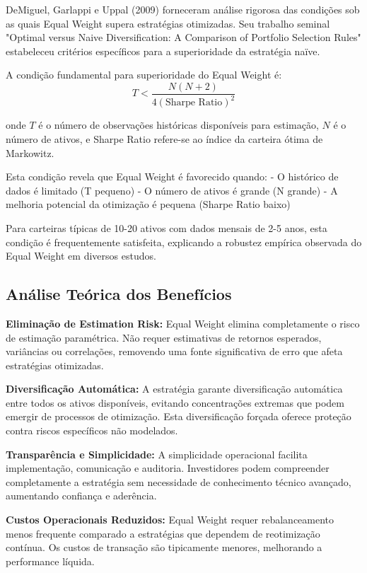 DeMiguel, Garlappi e Uppal (2009) forneceram análise rigorosa das condições sob as quais Equal Weight supera estratégias otimizadas. Seu trabalho seminal "Optimal versus Naive Diversification: A Comparison of Portfolio Selection Rules" estabeleceu critérios específicos para a superioridade da estratégia naïve.

A condição fundamental para superioridade do Equal Weight é:
\begin{equation}
T < \frac{N(N+2)}{4(\text{Sharpe Ratio})^2}
\end{equation}

onde $T$ é o número de observações históricas disponíveis para estimação, $N$ é o número de ativos, e Sharpe Ratio refere-se ao índice da carteira ótima de Markowitz.

Esta condição revela que Equal Weight é favorecido quando:
- O histórico de dados é limitado (T pequeno)
- O número de ativos é grande (N grande)
- A melhoria potencial da otimização é pequena (Sharpe Ratio baixo)

Para carteiras típicas de 10-20 ativos com dados mensais de 2-5 anos, esta condição é frequentemente satisfeita, explicando a robustez empírica observada do Equal Weight em diversos estudos.

\subsection{Análise Teórica dos Benefícios}

\textbf{Eliminação de Estimation Risk:} Equal Weight elimina completamente o risco de estimação paramétrica. Não requer estimativas de retornos esperados, variâncias ou correlações, removendo uma fonte significativa de erro que afeta estratégias otimizadas.

\textbf{Diversificação Automática:} A estratégia garante diversificação automática entre todos os ativos disponíveis, evitando concentrações extremas que podem emergir de processos de otimização. Esta diversificação forçada oferece proteção contra riscos específicos não modelados.

\textbf{Transparência e Simplicidade:} A simplicidade operacional facilita implementação, comunicação e auditoria. Investidores podem compreender completamente a estratégia sem necessidade de conhecimento técnico avançado, aumentando confiança e aderência.

\textbf{Custos Operacionais Reduzidos:} Equal Weight requer rebalanceamento menos frequente comparado a estratégias que dependem de reotimização contínua. Os custos de transação são tipicamente menores, melhorando a performance líquida.

